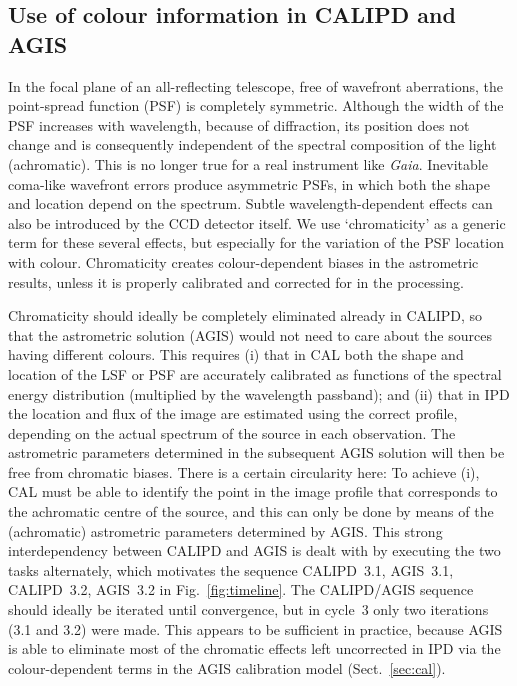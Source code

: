 \documentclass[longauth]{aa} %
\begin{document}
\subsection{Use of colour information in CALIPD and AGIS}
\label{sec:nuEff}

In the focal plane of an all-reflecting telescope, free of wavefront aberrations, the 
point-spread function (PSF) is completely symmetric. Although the width 
of the PSF increases with wavelength, because of diffraction, its position does 
not change and is consequently
independent of the spectral composition of the light (achromatic). This is no 
longer true for a real instrument like \textit{Gaia}. Inevitable coma-like wavefront 
errors produce asymmetric PSFs, in which both the shape and location 
depend on the spectrum. Subtle wavelength-dependent effects can also be 
introduced by the CCD detector itself. We use `chromaticity' as a generic term 
for these several effects, but especially for the variation of the PSF location 
with colour. Chromaticity creates colour-dependent biases in the astrometric
results, unless it is properly calibrated and corrected for in the processing.

Chromaticity should ideally be completely eliminated already in CALIPD, so that
the astrometric solution (AGIS) would not need to care about the sources having 
different colours. This requires (i) that in CAL both the shape and location of the 
LSF or PSF are accurately calibrated as functions of the spectral energy 
distribution (multiplied by the wavelength passband); and (ii) that in IPD the location 
and flux of the image are estimated using the correct profile, depending on 
the actual spectrum of the source in each observation. The astrometric parameters 
determined in the subsequent AGIS solution will then be free from chromatic 
biases. There is a certain circularity here: To achieve (i), CAL must be able to identify 
the point in the image profile that corresponds to the achromatic centre of the source, 
and this can only be done by means of the (achromatic) astrometric parameters 
determined by AGIS. This strong interdependency between CALIPD and AGIS is
dealt with by executing the two tasks alternately, which motivates the sequence 
CALIPD~3.1, AGIS~3.1, CALIPD~3.2, AGIS~3.2 in Fig.~\ref{fig:timeline}. The 
CALIPD/AGIS sequence should ideally be iterated until convergence, but in cycle~3
only two iterations (3.1 and 3.2) were made. This appears to be sufficient in practice,
because AGIS is able to eliminate most of the chromatic effects left uncorrected in IPD
via the colour-dependent terms in the AGIS calibration model (Sect.~\ref{sec:cal}).
\end{document}
